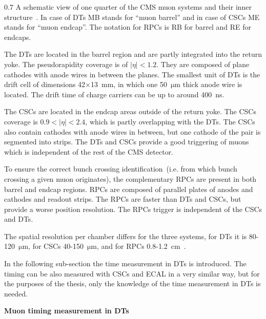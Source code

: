                  {0.7}       
                 {A schematic view of one quarter of the CMS muon systems and their inner structure~\cite{Chatrchyan:2013sba}. In case of DTs MB stands for ``muon barrel'' and in case of CSCs ME stands for ``muon endcap''. The notation for RPCs is RB for barrel and RE for endcaps. }

The DTs are located in the barrel region and are partly integrated into the return yoke.  The pseudorapidity coverage is of $|\eta|<1.2$. They are composed of plane cathodes with anode wires in between the planes. The smallest unit of DTs is the drift cell of dimensions 42$\times$13~mm, in which one 50~$\mathrm{\mu m}$ thick anode wire is located. The drift time of charge carriers can be up to around 400~ns.

The CSCs are located in the endcap areas outside of the return yoke. The CSCs coverage is $0.9<|\eta|<2.4$, which is partly overlapping with the DTs. The CSCs also contain cathodes with anode wires in between, but one cathode of the pair is segmented into strips. The DTs and CSCs provide a good triggering of muons which is independent of the rest of the CMS detector.

To ensure the correct bunch crossing identification~(i.e. from which bunch crossing a given muon originates), the complementary RPCs are present in both barrel and endcap regions. RPCs are composed of parallel plates of anodes and cathodes and readout strips. The RPCs are faster than DTs and CSCs, but provide a worse position resolution. The RPCs trigger is independent of the CSCs and DTs.  

The spatial resolution per chamber differs for the three systems, for DTs it is 80-120~$\mathrm{\mu m}$, for CSCs 40-150~$\mathrm{\mu m}$, and for RPCs 0.8-1.2~$\mathrm{cm}$~\cite{Chatrchyan:2013sba}.

In the following sub-section the time measurement in DTs is introduced. The timing can be also measured with CSCs and ECAL in a very similar way, but for the purposes of the thesis, only the knowledge of the time measurement in DTs is needed.


\textbf{Muon timing measurement in DTs~\label{sec:muonTiming}}

